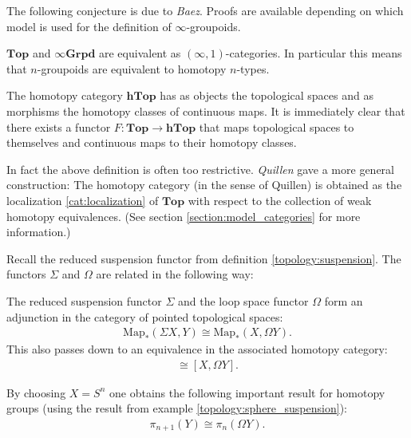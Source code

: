     The following conjecture is due to \textit{Baez}. Proofs are available depending on which model is used for the definition of $\infty$-groupoids.
    \begin{theorem}
        $\mathbf{Top}$ and $\mathbf{\infty Grpd}$ are equivalent as $(\infty, 1)$-categories. In particular this means that $n$-groupoids are equivalent to homotopy $n$-types.
    \end{theorem}

    \begin{property}
        The homotopy category $\mathbf{hTop}$ has as objects the topological spaces and as morphisms the homotopy classes of continuous maps. It is immediately clear that there exists a functor $F:\mathbf{Top}\rightarrow\mathbf{hTop}$ that maps topological spaces to themselves and continuous maps to their homotopy classes.

        In fact the above definition is often too restrictive. \textit{Quillen} gave a more general construction: The homotopy category (in the sense of Quillen) is obtained as the localization \ref{cat:localization} of $\mathbf{Top}$ with respect to the collection of weak homotopy equivalences. (See section \ref{section:model_categories} for more information.)
    \end{property}

    Recall the reduced suspension functor from definition \ref{topology:suspension}. The functors $\Sigma$ and $\Omega$ are related in the following way:
    \begin{property}\label{topology:eckmann_hilton}
        The reduced suspension functor $\Sigma$ and the loop space functor $\Omega$ form an adjunction in the category of pointed topological spaces:
        \begin{gather}
            \text{Map}_*(\Sigma X, Y)\cong\text{Map}_*(X, \Omega Y).
        \end{gather}
        This also passes down to an equivalence in the associated homotopy category:
        \begin{gather}
            [\Sigma X, Y]\cong[X, \Omega Y].
        \end{gather}
    \end{property}
    \begin{result}
        By choosing $X=S^n$ one obtains the following important result for homotopy groups (using the result from example \ref{topology:sphere_suspension}):
        \begin{gather}
            \pi_{n+1}(Y)\cong\pi_n(\Omega Y).
        \end{gather}
    \end{result}

